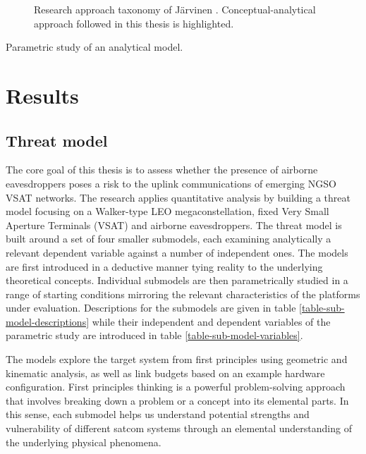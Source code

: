 \documentclass[english, 12pt, a4paper, elec, utf8, a-1b, online]{aaltothesis}
\begin{document}


\begin{figure}[h]
  \centering
  
  \caption{Research approach taxonomy of Järvinen \cite{jarvinen2011tutkimustyon, jarvinen2004research}. Conceptual-analytical approach followed in this thesis is highlighted.}
  \label{fig-research-taxonomy}
\end{figure}

Parametric study of an analytical model.

\clearpage

\section{Results}

\subsection{Threat model}
The core goal of this thesis is to assess whether the presence of airborne eavesdroppers poses a risk to the uplink communications of emerging NGSO VSAT networks.
The research applies quantitative analysis by building a threat model focusing on a Walker-type LEO megaconstellation, fixed Very Small Aperture Terminals (VSAT) and airborne eavesdroppers.
The threat model is built around a set of four smaller submodels, each examining analytically a relevant dependent variable against a number of independent ones.
The models are first introduced in a deductive manner tying reality to the underlying theoretical concepts.
Individual submodels are then parametrically studied in a range of starting conditions mirroring the relevant characteristics of the platforms under evaluation.
Descriptions for the submodels are given in table \ref{table-sub-model-descriptions} while their independent and dependent variables of the parametric study are introduced in table \ref{table-sub-model-variables}.

The models explore the target system from first principles using geometric and kinematic analysis, as well as link budgets based on an example hardware configuration.
First principles thinking is a powerful problem-solving approach that involves breaking down a problem or a concept into its elemental parts.
In this sense, each submodel helps us understand potential strengths and vulnerability of different satcom systems through an elemental understanding of the underlying physical phenomena. %
\end{document}
